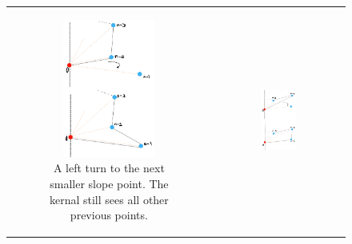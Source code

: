 \documentclass [12pt]{article}
\begin{document}
\begin{enumerate}[label=(\alph*)]
        \begin{figure}[h] 
            \begin{tabular}{cc}
                \begin{subfigure}{0.5\textwidth}
                    \centering
                    \includegraphics[width=0.7\textwidth]{images/stara.PNG}
                    \caption{A left turn to the next smaller slope point. The kernal still sees all other previous points.}
                    \label{fig:stara}
                \end{subfigure} &
                \begin{subfigure}{0.5\textwidth}
                    \centering
                    \includegraphics[width=0.6\textwidth]{images/starb.PNG}

\end{subfigure}
\end{tabular}
\end{figure}
\end{enumerate}
\end{document}
